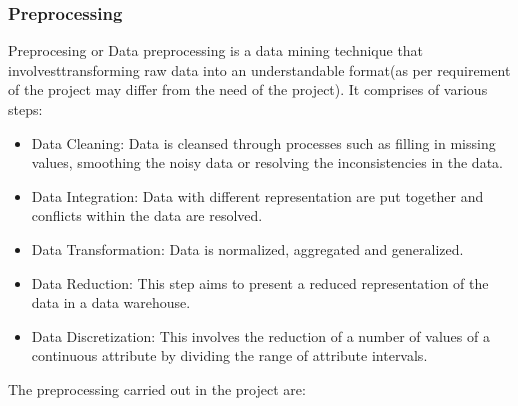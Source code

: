 \subsubsection{Preprocessing}
Preprocesing or Data preprocessing is a data mining technique that involvesttransforming raw data into an understandable format(as per requirement of the project may differ from the need of the project).
It comprises of various steps:
\begin{itemize}
\item Data Cleaning: Data is cleansed through processes such as filling in missing values, smoothing the noisy data or resolving the inconsistencies in the data.
\item Data Integration: Data with different representation are put together and conflicts within the data are resolved.
\item Data Transformation: Data is normalized, aggregated and generalized.
\item Data Reduction: This step aims to present a reduced representation of the data in a data warehouse.
\item Data Discretization: This involves the reduction of a number of values of a continuous attribute by dividing the range of attribute intervals. \\
\end{itemize}
The preprocessing carried out in the project are:

